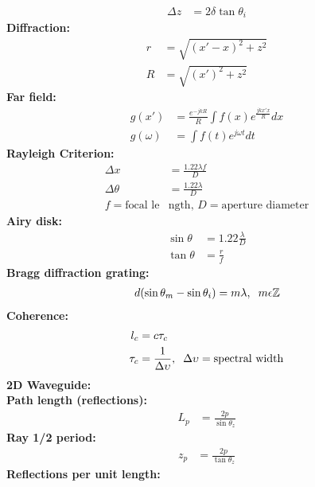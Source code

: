 \documentclass[landscape,a4paper]{article}
\begin{document}
\begin{multicols}{3}
\begin{align}
		\Delta z &= 2\delta \tan \theta_i
	\end{align}
	\textbf{Diffraction:}\\
	\begin{align}
		r &= \sqrt{(x'-x)^2 + z^2}\\
		R &= \sqrt{(x')^2 + z^2}
	\end{align}
	\hspace*{3mm}\textbf{Far field:}
	\begin{align}
		g(x') &= \frac{e^{-jkR}}{R} \int f(x) e^\frac{jkx'x}{R} dx\\
		g(\omega) &= \int f(t) e^{j\omega t} dt
	\end{align}
	\hspace{3mm}\textbf{Rayleigh Criterion:}
	\begin{align}
		\Delta x &= \frac{1.22 \lambda f}{D}\\
		\Delta \theta &= \frac{1.22 \lambda}{D}\\
		f = \text{focal le}&\text{ngth, } D = \text{aperture diameter} \nonumber
	\end{align}
	\hspace{3mm}\textbf{Airy disk:}
	\begin{align}
		\sin \theta &= 1.22 \frac{\lambda}{D}\\
		\tan \theta &= \frac{r}{f}
	\end{align}
	\hspace{3mm}\textbf{Bragg diffraction grating:}
	\begin{align}
		d(\sin \theta_m - \sin \theta_i) = m \lambda, \hspace{2mm}m \epsilon \mathbb{Z}
	\end{align}
	\textbf{Coherence:}
	\begin{align}
		l_c &= c \tau_c\\
		\tau_c &=  \frac{1}{\Delta \upsilon}, \hspace{2mm} \Delta \upsilon = \text{spectral width}
	\end{align}
	\textbf{2D Waveguide:}\\
	\hspace{3mm}\textbf{Path length (reflections):}
	\begin{align}
		L_p &= \frac{2p}{\sin \theta_z}
	\end{align}
	\hspace{3mm}\textbf{Ray 1/2 period:}
	\begin{align}
		z_p &= \frac{2p}{\tan \theta_z}
	\end{align}
	\hspace{3mm}\textbf{Reflections per unit length:}

\end{multicols}
\end{document}
